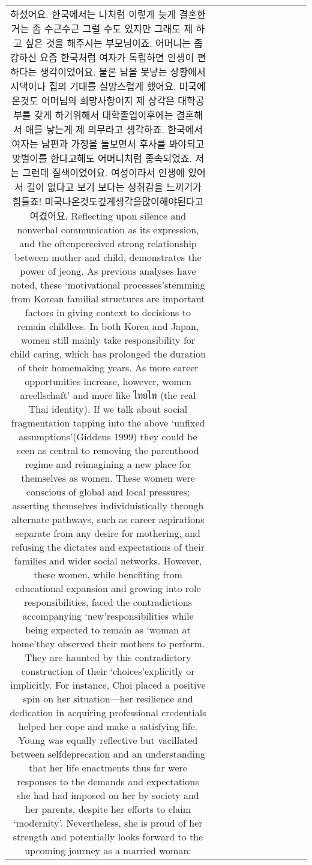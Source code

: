 \begin{table}[h!]
\begin{tabular}{|c|c|c|c|c|c|c|c|c|c|c|}
{하셨어요. 한국에서는 나처럼 이렇게 늦게 결혼한 거는 좀 수근수근 그럴 수도
있지만 그래도 제 하고 싶은 것을 해주시는 부모님이죠. 어머니는 좀 강하신
요즘 한국처럼 여자가 독립하면 인생이 편하다는 생각이었어요. 물론 남을 못낳는 상황에서 시댁이나 집의 기대를 실망스럽게 했어요. 미국에 온것도 어머님의 희망사항이지 제 상각은 대학공부를 갖게 하기위해서 대학졸업이후에는 결혼해서 애를 낳는게 제 의무라고 생각하죠. 한국에서 여자는 남편과 가정을 돌보면서 후사를 봐야되고 맞벌이를 한다고해도 어머니처럼 종속되었죠. 저는 그런데 질색이었어요.
여성이라서 인생에 있어서 길이 없다고 보기 보다는 성취감을 느끼기가 힘들죠! 미국나온것도깊게생각을많이해야된다고여겼어요.
Reflecting upon silence and nonverbal communication as its expression, and the oftenperceived strong relationship between mother and child, demonstrates the power of
jeong. As previous analyses have noted, these ‘motivational processes’stemming from Korean familial structures are important factors in giving context to decisions to remain childless. In both Korea and Japan, women still mainly take responsibility for child caring, which has prolonged the duration of their homemaking years. As more career opportunities increase, however, women areellschaft’ and more like ไทยไท (the real Thai identity). If we talk about social fragmentation tapping into the above ‘unfixed assumptions’(Giddens 1999) they could be seen as central to removing the parenthood regime and reimagining a new place for themselves as women. These women were conscious of global and local pressures; asserting themselves individuistically through alternate pathways, such as career aspirations separate from any desire for
mothering, and refusing the dictates and expectations of their families and wider social networks. However, these women, while benefiting from educational expansion and growing into role responsibilities, faced the contradictions accompanying ‘new’responsibilities while being expected to remain as ‘woman at home’they observed their mothers to perform.
They are haunted by this contradictory construction of their ‘choices’explicitly or implicitly. For instance, Choi placed a positive spin on her situation—her resilience and dedication in acquiring professional credentials helped her cope and make a satisfying life. Young was equally reflective but vacillated between selfdeprecation and an understanding that her life enactments thus far were responses to the demands and expectations she had had imposed on her by society and her parents, despite her efforts to claim ‘modernity’. Nevertheless, she is proud of her strength and potentially looks forward to the upcoming journey as a married woman:
}
\end{tabular}
\end{table}
